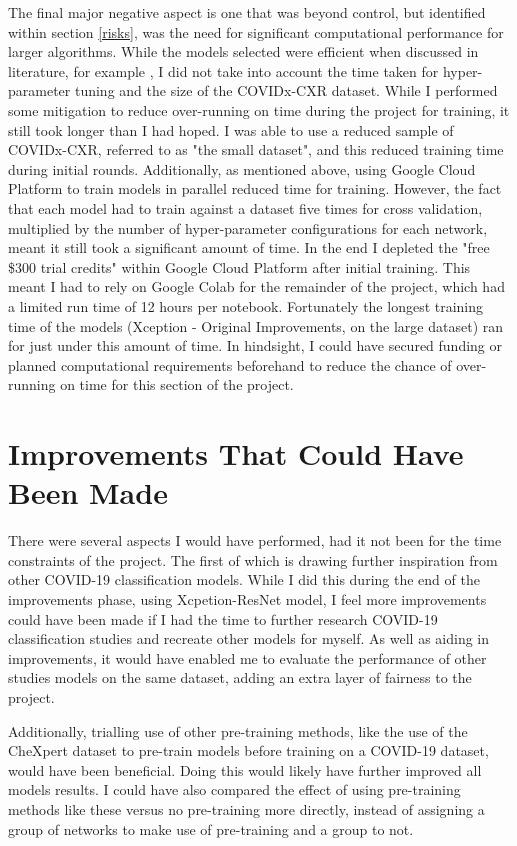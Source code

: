 The final major negative aspect is one that was beyond control, but identified within section \ref{risks}, was the need for significant computational performance for larger algorithms. While the models selected were efficient when discussed in literature, for example \cite{KerasApp92:online}, I did not take into account the time taken for hyper-parameter tuning and the size of the COVIDx-CXR dataset. While I performed some mitigation to reduce over-running on time during the project for training, it still took longer than I had hoped. I was able to use a reduced sample of COVIDx-CXR, referred to as "the small dataset", and this reduced training time during initial rounds. Additionally, as mentioned above, using Google Cloud Platform to train models in parallel reduced time for training. However, the fact that each model had to train against a dataset five times for cross validation, multiplied by the number of hyper-parameter configurations for each network, meant it still took a significant amount of time. In the end I depleted the "free \$300 trial credits" within Google Cloud Platform after initial training. This meant I had to rely on Google Colab for the remainder of the project, which had a limited run time of 12 hours per notebook. Fortunately the longest training time of the models (Xception - Original Improvements, on the large dataset) ran for just under this amount of time. In hindsight, I could have secured funding or planned computational requirements beforehand to reduce the chance of over-running on time for this section of the project.

\section{Improvements That Could Have Been Made}
There were several aspects I would have performed, had it not been for the time constraints of the project. The first of which is drawing further inspiration from other COVID-19 classification models. While I did this during the end of the improvements phase, using \cite{fitriasari2021improvement} Xcpetion-ResNet model, I feel more improvements could have been made if I had the time to further research COVID-19 classification studies and recreate other models for myself. As well as aiding in improvements, it would have enabled me to evaluate the performance of other studies models on the same dataset, adding an extra layer of fairness to the project.

Additionally, trialling use of other pre-training methods, like the \cite{bressem2020comparing} use of the CheXpert dataset to pre-train models before training on a COVID-19 dataset, would have been beneficial. Doing this would likely have further improved all models results. I could have also compared the effect of using pre-training methods like these versus no pre-training more directly, instead of assigning a group of networks to make use of pre-training and a group to not.

